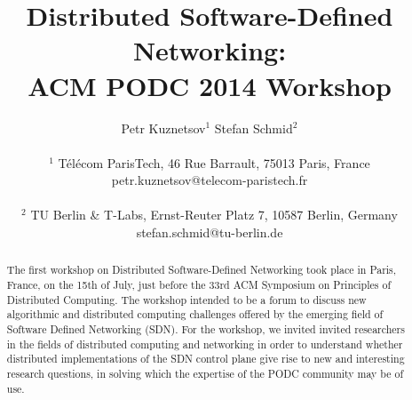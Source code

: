 \documentclass[11pt,pdftex,letter]{article}
\def\SAVESPACE{1}
\begin{document}
\sloppy




\title{Distributed Software-Defined Networking:\\ ACM PODC 2014 Workshop }



\author{
Petr Kuznetsov$^{1}$ \quad Stefan Schmid$^{2}$\\
\\
       $^{1}$ T\'el\'ecom ParisTech, 46 Rue Barrault, 75013 Paris, France\\
        petr.kuznetsov@telecom-paristech.fr\\
\\
        $^{2}$ TU Berlin \& T-Labs, Ernst-Reuter Platz 7, 10587 Berlin, Germany\\
	    stefan.schmid@tu-berlin.de}


\date{}


\maketitle


\thispagestyle{empty}





\begin{abstract}
The first workshop on Distributed Software-Defined Networking took
place in Paris, France, on the 15th of July, just before 
the 33rd ACM Symposium on Principles of Distributed Computing. 
The workshop intended to be a forum to discuss new algorithmic and
distributed computing challenges offered by the emerging field of
Software Defined Networking (SDN).
For the workshop, we invited invited researchers in the fields of
distributed computing and networking in order to understand whether distributed implementations of the
SDN control plane give rise to new and interesting research questions,
in solving which  the expertise of the PODC community may be of use.
\end{abstract}
\end{document}
